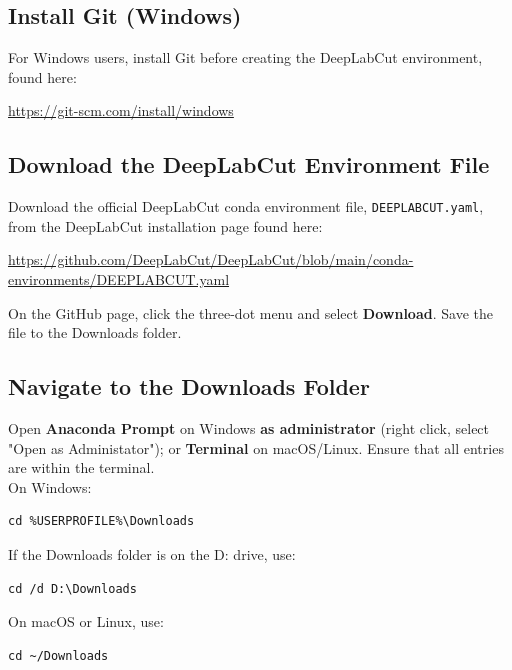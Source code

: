 \documentclass[11pt]{article}
\renewcommand{\[}{%
  \par\smallskip\noindent
  \begin{center}%
  \setlength{\fboxsep}{5pt}%
  \setlength{\fboxrule}{0.35pt}%
  \begin{lrbox}{\almaEquationBox}%
  $\displaystyle
}
\renewcommand{\]}{%
  $%
  \end{lrbox}%
  \fcolorbox{equationLine}{equationBack}{\usebox{\almaEquationBox}}%
  \end{center}%
  \smallskip\par
}
\begin{document}
\subsection{Install Git (Windows)}

For Windows users, install Git before creating the DeepLabCut environment, found here:

\begin{tcolorbox}
\url{https://git-scm.com/install/windows}
\end{tcolorbox}

\subsection{Download the DeepLabCut Environment File}

Download the official DeepLabCut conda environment file, \texttt{DEEPLABCUT.yaml}, from the DeepLabCut installation page found here: 

\begin{tcolorbox}
\url{https://github.com/DeepLabCut/DeepLabCut/blob/main/conda-environments/DEEPLABCUT.yaml}
\end{tcolorbox}
\noindent On the GitHub page, click the three-dot menu and select \textbf{Download}. Save the file to the Downloads folder.

\subsection{Navigate to the Downloads Folder}
Open \textbf{Anaconda Prompt} on Windows \textbf{as administrator} (right click, select "Open as Administator"); or \textbf{Terminal} on macOS/Linux. Ensure that all entries are within the terminal. \\

\noindent On Windows:

\begin{tcolorbox}
\begin{verbatim}
cd %USERPROFILE%\Downloads
\end{verbatim}
\end{tcolorbox}
\noindent If the Downloads folder is on the D: drive, use:
\begin{tcolorbox}
\begin{verbatim}
cd /d D:\Downloads
\end{verbatim}
\end{tcolorbox}
\noindent On macOS or Linux, use:
\begin{tcolorbox}
\begin{verbatim}
cd ~/Downloads
\end{verbatim}
\end{tcolorbox}
\end{document}
